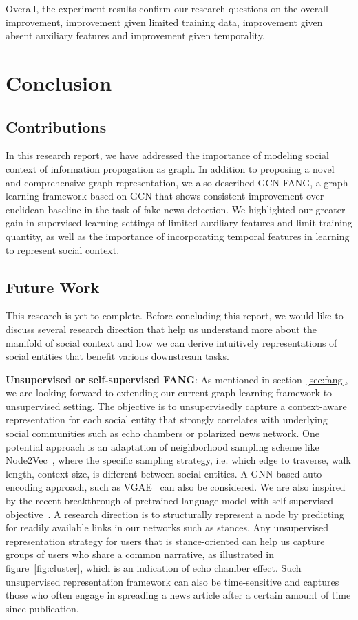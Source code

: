 \documentclass[fyp]{socreport}
\theoremstyle{definition}
\theoremstyle{hypothesis}
\begin{document}
Overall, the experiment results confirm our research questions on the overall improvement, improvement given limited training data, improvement given absent auxiliary features and improvement given temporality.

\chapter{Conclusion}
\section{Contributions}
In this research report, we have addressed the importance of modeling social context of information propagation as graph. In addition to proposing a novel and comprehensive graph representation, we also described GCN-FANG, a graph learning framework based on GCN that shows consistent improvement over euclidean baseline in the task of fake news detection. We highlighted our greater gain in supervised learning settings of limited auxiliary features and limit training quantity, as well as the importance of incorporating temporal features in learning to represent social context.

\section{Future Work}
\label{sec:future_work}
This research is yet to complete. Before concluding this report, we would like to discuss several research direction that help us understand more about the manifold of social context and how we can derive intuitively representations of social entities that benefit various downstream tasks.

\textbf{Unsupervised or self-supervised FANG}: As mentioned in section~\ref{sec:fang}, we are looking forward to extending our current graph learning framework to unsupervised setting. The objective is to unsupervisedly capture a context-aware representation for each social entity that strongly correlates with underlying social communities such as echo chambers or polarized news network. One potential approach is an adaptation of neighborhood sampling scheme like Node2Vec~\cite{grover2016node2vec}, where the specific sampling strategy, i.e. which edge to traverse, walk length, context size, is different between social entities. A GNN-based auto-encoding approach, such as VGAE~\cite{kipf2016variational} can also be considered. We are also inspired by the recent breakthrough of pretrained language model with self-supervised objective~\cite{devlin2019bert}. A research direction is to structurally represent a node by predicting for readily available links in our networks such as stances.
Any unsupervised representation strategy for users that is stance-oriented can help us capture groups of users who share a common narrative, as illustrated in figure~\ref{fig:cluster}, which is an indication of echo chamber effect. Such unsupervised representation framework can also be time-sensitive and captures those who often engage in spreading a news article after a certain amount of time since publication. 
\end{document}
